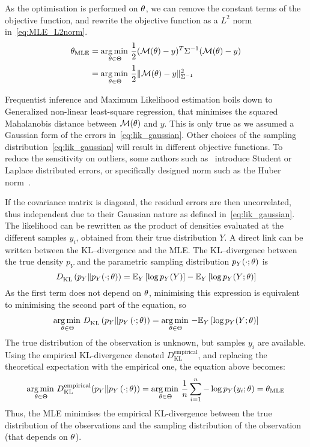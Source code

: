 \documentclass[../../Main_ManuscritThese.tex]{subfiles}
\begin{document}
  As the optimisation is performed on $\theta$, we can remove the
  constant terms of the objective function, and rewrite the objective
  function as a $L^2$ norm
  in~\cref{eq:MLE_L2norm}.  %
  \begin{align}
    {\theta}_{\mathrm{MLE}} &= \operatorname*{arg\,min \,}_{\theta \in \Theta}\frac{1}{2}(\mathcal{M}(\theta) - y)^T\Sigma^{-1}(\mathcal{M}(\theta) - y) \nonumber\\
                           &= \operatorname*{arg\,min \,}_{\theta \in \Theta}\frac12 \| \mathcal{M}(\theta) - y \|^2_{\Sigma^{-1}} \label{eq:MLE_L2norm}
  \end{align}

  Frequentist inference and Maximum Likelihood estimation boils down
  to Generalized non-linear least-square regression, that minimises
  the squared Mahalanobis distance between $\mathcal{M}({\theta})$ and
  $y$. This is only true as we assumed a Gaussian form of the errors
  in~\cref{eq:lik_gaussian}. Other choices of the sampling
  distribution~\cref{eq:lik_gaussian} will result in different
  objective functions. To reduce the sensitivity on outliers, some
  authors such as~\cite{rao_robust_2015} introduce Student or Laplace
  distributed errors, or specifically designed norm such as the Huber
  norm~\citep{huber_robust_2011}.

  If the covariance matrix is diagonal, the residual errors are then
  uncorrelated, thus independent due to their Gaussian nature as
  defined in~\cref{eq:lik_gaussian}. The likelihood can be rewritten
  as the product of densities evaluated at the different samples
  $y_i$, obtained from their true distribution $Y$.  A direct link can
  be written between the KL--divergence and the MLE. The
  KL--divergence between the true density $p_Y$ and the parametric
  sampling distribution $p_Y(\cdot;\theta)$ is
  \begin{equation}
  D^{\mathrm{}}_{\mathrm{KL}}\left(p_Y \| p_Y(\cdot;\theta)\right) = \mathbb{E}_Y\left[\log p_Y(Y)\right]-\mathbb{E}_Y\left[\log p_Y(Y;\theta)\right]  
\end{equation}
As the first term does not depend on $\theta$, minimising this expression
is equivalent to minimising the second part of the equation, so
\begin{align}
 \operatorname*{arg\,min \,}_{\theta \in\Theta} D^{\mathrm{}}_{\mathrm{KL}}\left(p_Y \| p_Y\left(\cdot;\theta \right)\right) = \operatorname*{arg\,min \,}_{\theta \in \Theta} -\mathbb{E}_{Y}\left[\log p_{Y}(Y ; \theta)\right]
\end{align}
The true distribution of the observation is unknown, but samples $y_i$
are available. Using the empirical KL-divergence denoted
$D^{\mathrm{empirical}}_{\mathrm{KL}}$, and replacing the theoretical
expectation with the empirical one, the equation above becomes:
\begin{equation}
  \operatorname*{arg\,min \,}_{\theta \in\Theta} D^{\mathrm{empirical}}_{\mathrm{KL}}(p_Y \| p_Y\left(\cdot;\theta \right)) = \operatorname*{arg\,min \,}_{\theta \in\Theta} \frac{1}{n} \sum_{i=1}^n - \log p_Y(y_i;\theta) = {\theta}_{\mathrm{MLE}}
\end{equation}
Thus, the MLE minimises the empirical KL-divergence between the true
distribution of the observations and the sampling distribution of the
observation (that depends on $\theta$).
\end{document}
